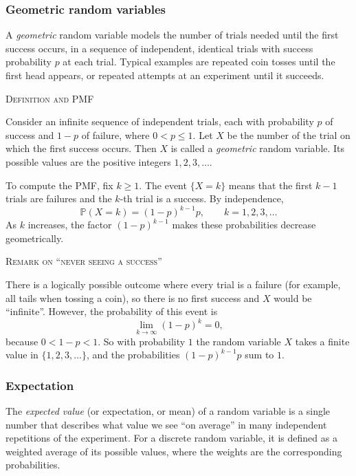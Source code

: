 \subsubsection{Geometric random variables}

A \textit{geometric} random variable models the number of trials needed until the first success occurs, in a sequence of independent, identical trials with success probability \(p\) at each trial.  
Typical examples are repeated coin tosses until the first head appears, or repeated attempts at an experiment until it succeeds.

\bigskip\textsc{Definition and PMF}

Consider an infinite sequence of independent trials, each with probability \(p\) of success and \(1-p\) of failure, where \(0 < p \le 1\).  
Let \(X\) be the number of the trial on which the first success occurs.  
Then \(X\) is called a \textit{geometric} random variable.  
Its possible values are the positive integers \(1,2,3,\dots\).

To compute the PMF, fix \(k \ge 1\).  
The event \(\{X = k\}\) means that the first \(k-1\) trials are failures and the \(k\)-th trial is a success.  
By independence,
\[
\mathbb{P}(X = k) = (1-p)^{k-1} p, \qquad k = 1,2,3,\dots
\]
As \(k\) increases, the factor \((1-p)^{k-1}\) makes these probabilities decrease geometrically.

\bigskip\textsc{Remark on “never seeing a success”}

There is a logically possible outcome where every trial is a failure (for example, all tails when tossing a coin), so there is no first success and \(X\) would be “infinite”.  
However, the probability of this event is
\[
\lim_{k \to \infty} (1-p)^k = 0,
\]
because \(0 < 1-p < 1\).  
So with probability \(1\) the random variable \(X\) takes a finite value in \(\{1,2,3,\dots\}\), and the probabilities \((1-p)^{k-1}p\) sum to \(1\).



\subsubsection{Expectation}

The \textit{expected value} (or expectation, or mean) of a random variable is a single number that describes what value we see “on average” in many independent repetitions of the experiment.  
For a discrete random variable, it is defined as a weighted average of its possible values, where the weights are the corresponding probabilities.

